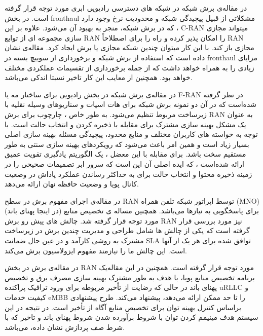 در مقاله‌ی 
\cite{larsen2018fronthaul,costanzo2018network}
برش شبکه در شبکه های دسترسی رادیویی ابری مورد توجه قرار گرفته است. 
در بخش fronthaul مشکلاتی از قبیل پیچیدگی شبکه و محدودیت نرخ وجود دارد که در برش شبکه، منجر به بهبود آن می‌شود.
علاوه بر این ، C-RAN میتواند مجازی سازی مجموعه ای از توابع RAN را امکان پذیر کرده و راه را برای اصطلاحاً RAN مجازی باز کند. با این کار میتوان چندین شبکه مجازی یا برش ایجاد کرد.
 مقاله‌ی
\cite{larsen2018fronthaul}
نشان داده است که استفاده از برش شبکه و برخورداری از سوییچ بسته در fronthaul
مزایای زیادی را به همراه خواهد داشت که از جمله برخورداری از تقسیمات عملکردی مختلف خواهد بود. همچنین از معایب این کار تاخیر نسبتا اندکی می‌باشد.

در مقاله‌ی 
\cite{fran}
برش شبکه در بخش رادیویی برای ساختار مه 
 یا F-RAN
  در نظر گرفته شده‌است که در آن دو نمونه برش شبکه برای هات اسپات و سناریوهای وسیله نقلیه با زیرساخت مربوط تنظیم می‌شود. به طور خاص ، چارچوب برای برش RAN به عنوان یک مشکل بهینه سازی مشترک برای مقابله با ذخیره کردن و انتخاب حالت است.
  با توجه به خواسته های کاربران مختلف و منابع محدود، پیچیدگی مسئله بهینه سازی اصلی بسیار زیاد است و همین امر باعث می‌شود که رویکردهای بهینه سازی سنتی به طور مستقیم سخت باشد.
 برای مقابله با این معضل ، یک الگوریتم یادگیری تقویت عمیق ارائه شده‌است ، که ایده اصلی آن این است که سرور ابر تصمیمات صحیحی را در زمینه ذخیره محتوا و انتخاب حالت برای به حداکثر رساندن عملکرد پاداش در وضعیت کانال پویا و وضعیت حافظه نهان ارائه می‌دهد.

در مقاله‌ی 
\cite{ranSlice, ranSlice1}
اجرای مفهوم برش در سطح RAN توسط اپراتور شبکه تلفن همراه (MNO) برای پاسخگویی به نیازها می‌باشد. همچنین مساله ی تخصیص منابع (در اینجا پهنای باند) مورد توجه قرار گرفته شد.
چالش های پیش رو برش RAN نیز مورد بررسی قرار گرفته است که یکی از چالش ها
شامل طراحی و مدیریت چندین برش در زیرساخت مشترک به روشی کارآمد و در عین حال ضمانت SLA توافق شده برای هر یک از آنها است.
این چالش ما را نیازمند مفهوم ایزولاسیون برش می‌کند.

در مقاله‌ی 
\cite{ranslice2}
برش در بخش RAN مورد توجه قرار گرفته است.
همچنین
در این مقاله‌یک برنامه تخصیص منابع پویا، با هدف به طور مشترک بهینه سازی مصرف برق و تخصیص پهنای باند در حالی که رضایت از تأخیر مربوطه برای ورود ترافیک پراکنده uRLLC و کیفیت خدمات eMBB را تا حد ممکن ارائه می‌دهد، پیشنهاد می‌کند.
طرح پیشنهادی براساس کنترل بهینه توان برای تخصیص منابع آگاه از تأخیر است.
در نتیجه در این سیستم هدف مینیمم کردن توان با شروط برآورده شدن شروط پهنای باند و  تاخیر که با شرط صف پردازش نشان داده، می‌باشد.

